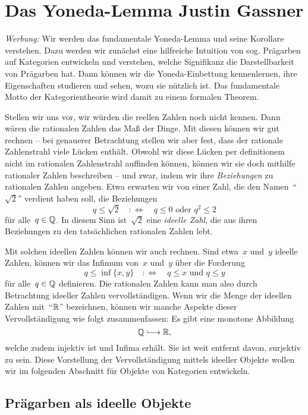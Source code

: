 \section[Das Yoneda-Lemma]{Das Yoneda-Lemma \hfill \small Justin Gassner}

\emph{Werbung:} Wir werden das fundamentale Yoneda-Lemma und seine Korollare
verstehen. Dazu werden wir zunächst eine hilfreiche Intuition von sog. Prägarben auf
Kategorien entwickeln und verstehen, welche Signifikanz die Darstellbarkeit von
Prägarben hat. Dann können wir die Yoneda-Einbettung kennenlernen, ihre
Eigenschaften studieren und sehen, wozu sie nützlich ist. Das fundamentale
Motto der Kategorientheorie wird damit zu einem formalen Theorem.

Stellen wir uns vor, wir würden die reellen Zahlen noch nicht kennen. Dann
wären die rationalen Zahlen das Maß der Dinge. Mit diesen können
wir gut rechnen -- bei genauerer Betrachtung stellen wir aber fest, dass der
rationale Zahlenstrahl viele Lücken enthält. Obwohl wir diese Lücken per
definitionem nicht im rationalen Zahlenstrahl auffinden können, können wir sie
doch mithilfe rationaler Zahlen beschreiben -- und zwar, indem wir ihre
\emph{Beziehungen} zu rationalen Zahlen angeben. Etwa erwarten wir
von einer Zahl, die den Namen~"`$\sqrt{2}$"' verdient haben soll, die Beziehungen
\[ q \leq \sqrt{2} \quad:\Longleftrightarrow\quad
  \text{$q \leq 0$ oder $q^2 \leq 2$} \]
für alle~$q \in \mathbb{Q}$. In diesem Sinn ist~$\sqrt{2}$ eine \emph{ideelle Zahl},
die aus ihren Beziehungen zu den tatsächlichen rationalen Zahlen lebt.

Mit solchen ideellen Zahlen können wir auch rechnen. Sind etwa~$x$ und~$y$
ideelle Zahlen, können wir das Infimum von~$x$ und~$y$ über die Forderung
\[ q \leq \inf\{x,y\} \quad:\Longleftrightarrow\quad
  \text{$q \leq x$ und $q \leq y$} \]
für alle~$q \in \mathbb{Q}$ definieren. Die rationalen Zahlen kann man also
durch Betrachtung ideeller Zahlen vervollständigen. Wenn wir die Menge der
ideellen Zahlen mit~"`$\mathbb{R}$"' bezeichnen, können wir manche Aspekte dieser
Vervollständigung wie folgt zusammenfassen: Es gibt eine monotone
Abbildung
\[ \QQ \lhra \RR, \]
welche zudem injektiv ist und Infima erhält. Sie ist weit entfernt davon,
surjektiv zu sein. Diese Vorstellung der Vervollständigung mittels ideeller
Objekte wollen wir im folgenden Abschnitt für Objekte von Kategorien
entwickeln.


\subsection{Prägarben als ideelle Objekte}


